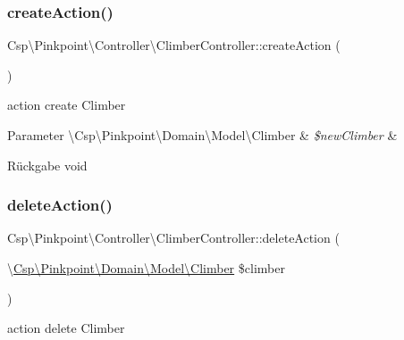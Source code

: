 \subsubsection{\texorpdfstring{create\+Action()}{createAction()}}
{\footnotesize\ttfamily Csp\textbackslash{}\+Pinkpoint\textbackslash{}\+Controller\textbackslash{}\+Climber\+Controller\+::create\+Action (\begin{DoxyParamCaption}{ }\end{DoxyParamCaption})}

action create Climber


\begin{DoxyParams}[1]{Parameter}
\textbackslash{}\+Csp\textbackslash{}\+Pinkpoint\textbackslash{}\+Domain\textbackslash{}\+Model\textbackslash{}\+Climber & {\em \$new\+Climber} & \\
\hline
\end{DoxyParams}
\begin{DoxyReturn}{Rückgabe}
void 
\end{DoxyReturn}
\mbox{\label{classCsp_1_1Pinkpoint_1_1Controller_1_1ClimberController_af9e56ebf2cb511b8e4215a309e25fbfc}} 
\subsubsection{\texorpdfstring{delete\+Action()}{deleteAction()}}
{\footnotesize\ttfamily Csp\textbackslash{}\+Pinkpoint\textbackslash{}\+Controller\textbackslash{}\+Climber\+Controller\+::delete\+Action (\begin{DoxyParamCaption}\item[{\textbackslash{}\hyperlink{classCsp_1_1Pinkpoint_1_1Domain_1_1Model_1_1Climber}{Csp\textbackslash{}\+Pinkpoint\textbackslash{}\+Domain\textbackslash{}\+Model\textbackslash{}\+Climber}}]{\$climber }\end{DoxyParamCaption})}

action delete Climber


